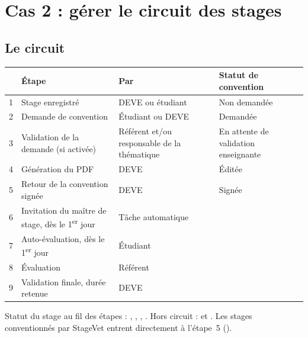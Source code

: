 \documentclass[11pt,a4paper]{article}
\begin{document}

\section{Cas 2 : gérer le circuit des stages}
\label{sec:cas2}

\subsection{Le circuit}

\begin{center}
\small
\begin{tabularx}{\linewidth}{@{}c >{\raggedright\arraybackslash}X l l@{}}
\toprule
& \textbf{Étape} & \textbf{Par} & \textbf{Statut de convention} \\
\midrule
1 & Stage enregistré & DEVE ou étudiant & Non demandée \\
2 & Demande de convention & Étudiant ou DEVE & Demandée \\
3 & Validation de la demande (si activée) & Référent et/ou responsable de la thématique & En attente de validation enseignante \\
4 & Génération du PDF & DEVE & Éditée \\
5 & Retour de la convention signée & DEVE & Signée \\
6 & Invitation du maître de stage, dès le 1\textsuperscript{er} jour & Tâche automatique & \\
7 & Auto-évaluation, dès le 1\textsuperscript{er} jour & Étudiant & \\
8 & Évaluation & Référent & \\
9 & Validation finale, durée retenue & DEVE & \\
\bottomrule
\end{tabularx}
\end{center}

Statut du stage au fil des étapes : , , , . Hors
circuit :  et . Les stages conventionnés par
StageVet entrent directement à l'étape~5 ().
\end{document}
